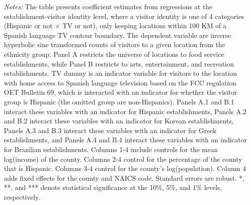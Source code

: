 \begin{table}[!htbp]
{\begin{threeparttable}
\begin{tablenotes}[flushleft]
				\item \textit{Notes:} The table presents coefficient estimates from regressions at the establishment-visitor identity level, where a visitor identity is one of 4 categories (Hispanic or not $\times$ TV or not), only keeping locations within 100 KM of a Spanish language TV contour boundary. The dependent variable are inverse hyperbolic sine transformed counts of visitors to a given location from the ethnicity group. Panel A restricts the universe of locations to food service establishments, while Panel B restricts to arts, entertainment, and recreation establishments. TV dummy is an indicator variable for visitors to the location with home access to Spanish language television based on the FCC regulation OET Bulletin 69, which is interacted with an indicator for whether the visitor group is Hispanic (the omitted group are non-Hispanics). Panels A.1 and B.1 interact these variables with an indicator for Hispanic establishments, Panels A.2 and B.2 interact these variables with an indicator for Korean establishments, Panels A.3 and B.3 interact these variables with an indicator for Greek establishments, and Panels A.4 and B.4 interact these variables with an indicator for Brazilian establishments.   Columns 1-4 include controls for the mean log(income) of the county. Columns 2-4 control for the percentage of the county that is Hispanic. Columns 3-4 control for the county's log(population). Column 4 adds fixed effects for the county and NAICS code. Standard errors are robust. *, **, and *** denote statistical significance at the 10\%, 5\%, and 1\% levels, respectively.
			\end{tablenotes}
		\end{threeparttable}
	}
\end{table}